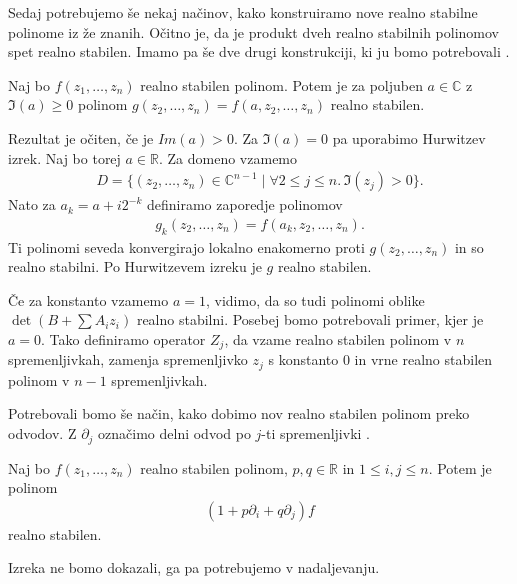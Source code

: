 Sedaj potrebujemo še nekaj načinov, kako konstruiramo nove realno stabilne polinome iz že znanih. Očitno je, da je produkt dveh realno stabilnih polinomov spet realno stabilen. Imamo pa še dve drugi konstrukciji, ki ju bomo potrebovali \cite{wagner-multivariate}.
\begin{izrek}
    Naj bo \(f(z_1, \ldots, z_n)\) realno stabilen polinom. Potem je za poljuben \(a\in \mathbb C\) z \(\Im(a)\geq 0\) polinom \(g(z_2, \ldots, z_n) = f(a, z_2, \ldots, z_n)\) realno stabilen.
\end{izrek}
\begin{dokaz}
    Rezultat je očiten, če je \(Im(a) > 0\). Za \(\Im(a) = 0\) pa uporabimo Hurwitzev izrek. Naj bo torej \(a\in \mathbb R\). Za domeno vzamemo
    \begin{align*}
        D=\{(z_2,\ldots,z_n) \in \mathbb C^{n-1}\mid \forall 2\leq j \leq n.\, \Im(z_j)> 0\}.
    \end{align*}
    Nato za \(a_k = a + i 2^{-k}\) definiramo zaporedje polinomov
    \begin{align*}
        g_k(z_2, \ldots, z_n) = f(a_k, z_2, \ldots, z_n).
    \end{align*}
    Ti polinomi seveda konvergirajo lokalno enakomerno proti \(g(z_2, \ldots, z_n)\) in so realno stabilni. Po Hurwitzevem izreku je \(g\) realno stabilen.
\end{dokaz}
Če za konstanto vzamemo \(a=1\), vidimo, da so tudi polinomi oblike \(\det(B + \sum A_i z_i)\) realno stabilni.
Posebej bomo potrebovali primer, kjer je \(a = 0\). Tako definiramo operator \(Z_j\), da vzame realno stabilen polinom v \(n\) spremenljivkah, zamenja spremenljivko \(z_j\) s konstanto \(0\) in vrne realno stabilen polinom v \(n-1\) spremenljivkah.

Potrebovali bomo še način, kako dobimo nov realno stabilen polinom preko odvodov. Z \(\partial_j\) označimo delni odvod po \(j\)-ti spremenljivki \cite{Borcea_2010}.
\begin{izrek}
    Naj bo \(f(z_1, \ldots, z_n)\) realno stabilen polinom, \(p, q\in \mathbb R\) in \(1\leq i, j \leq n\). Potem je polinom
    \begin{align*}
        (1+p\partial_i + q\partial_j)f
    \end{align*}
    realno stabilen.
\end{izrek}
Izreka ne bomo dokazali, ga pa potrebujemo v nadaljevanju.

